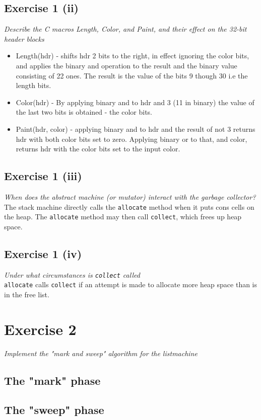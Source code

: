 \documentclass[a4paper, titlepage]{article}
\begin{document}
\subsection{Exercise 1 (ii)}
\textit{Describe the C macros Length, Color, and Paint, and their effect on the
32-bit header blocks}\\

\begin{itemize}
	\item Length(hdr) - shifts hdr 2 bits to the right, in effect
		ignoring the color bits, and applies the binary and operation to
		the result and the binary value consisting of 22 ones. The
		result is the value of the bits 9 though 30 i.e the length bits.
	\item Color(hdr) - By applying binary and to hdr and 3 (11 in binary)
		the value of the last two bits is obtained - the color bits.
	\item Paint(hdr, color) - applying binary and to hdr and the result of
		not 3 returns hdr with both color bits set to zero. Applying
		binary or to that, and color, returns hdr with the color bits
		set to the input color.
\end{itemize}
\subsection{Exercise 1 (iii)}
\textit{When does the abstract machine (or mutator) interact with the garbage
collector?}\\

The stack machine directly calls the \texttt{allocate} method when it puts cons
cells on the heap. The \texttt{allocate} method may then call \texttt{collect},
which frees up heap space.

\subsection{Exercise 1 (iv)}
\textit{Under what circumstances is \emph{\texttt{collect}} called}\\

\texttt{allocate} calls \texttt{collect} if an attempt is made to allocate more
heap space than is in the free list.
\section{Exercise 2}
\textit{Implement the "mark and sweep" algorithm for the listmachine}\\

\subsection{The "mark" phase}
\subsection{The "sweep" phase}
\end{document}
